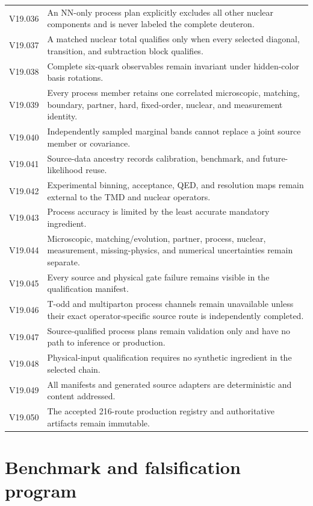 \documentclass[11pt]{article}
\begin{document}
\begin{longtable}{L{0.12\textwidth}L{0.80\textwidth}}
V19.036 & An NN-only process plan explicitly excludes all other nuclear components and is never labeled the complete deuteron.\\
V19.037 & A matched nuclear total qualifies only when every selected diagonal, transition, and subtraction block qualifies.\\
V19.038 & Complete six-quark observables remain invariant under hidden-color basis rotations.\\
V19.039 & Every process member retains one correlated microscopic, matching, boundary, partner, hard, fixed-order, nuclear, and measurement identity.\\
V19.040 & Independently sampled marginal bands cannot replace a joint source member or covariance.\\
V19.041 & Source-data ancestry records calibration, benchmark, and future-likelihood reuse.\\
V19.042 & Experimental binning, acceptance, QED, and resolution maps remain external to the TMD and nuclear operators.\\
V19.043 & Process accuracy is limited by the least accurate mandatory ingredient.\\
V19.044 & Microscopic, matching/evolution, partner, process, nuclear, measurement, missing-physics, and numerical uncertainties remain separate.\\
V19.045 & Every source and physical gate failure remains visible in the qualification manifest.\\
V19.046 & T-odd and multiparton process channels remain unavailable unless their exact operator-specific source route is independently completed.\\
V19.047 & Source-qualified process plans remain validation only and have no path to inference or production.\\
V19.048 & Physical-input qualification requires no synthetic ingredient in the selected chain.\\
V19.049 & All manifests and generated source adapters are deterministic and content addressed.\\
V19.050 & The accepted 216-route production registry and authoritative artifacts remain immutable.\\
\bottomrule
\end{longtable}

\section{Benchmark and falsification program}
\label{sec:benchmarks}
\end{document}
